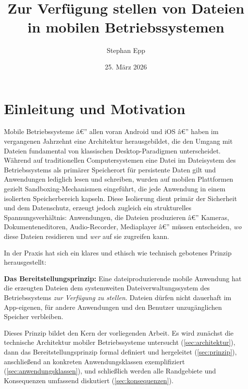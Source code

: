 ﻿\documentclass[12pt, a4paper]{article}
\title{\textbf{Zur Verfügung stellen von Dateien\\ in mobilen Betriebssystemen}}
\author{Stephan Epp}
\date{25. März 2026}
\begin{document}

\maketitle
\tableofcontents
\newpage

\section{Einleitung und Motivation}
\label{sec:einleitung}

Mobile Betriebssysteme â€” allen voran Android und iOS â€” haben im vergangenen Jahrzehnt
eine Architektur herausgebildet, die den Umgang mit Dateien fundamental von klassischen
Desktop-Paradigmen unterscheidet. Während auf traditionellen Computersystemen eine
Datei im Dateisystem des Betriebssystems als primärer Speicherort für persistente Daten
gilt und Anwendungen lediglich lesen und schreiben, wurden auf mobilen Plattformen
gezielt Sandboxing-Mechanismen eingeführt, die jede Anwendung in einem isolierten
Speicherbereich kapseln. Diese Isolierung dient primär der Sicherheit und dem Datenschutz,
erzeugt jedoch zugleich ein strukturelles Spannungsverhältnis: Anwendungen, die Dateien
produzieren â€” Kameras, Dokumenteneditoren, Audio-Recorder, Mediaplayer â€” müssen
entscheiden, \emph{wo} diese Dateien residieren und \emph{wer} auf sie zugreifen kann.

In der Praxis hat sich ein klares und ethisch wie technisch gebotenes Prinzip herausgestellt:

\noindent\textbf{Das Bereitstellungsprinzip:} Eine dateiproduzierende mobile Anwendung hat die
erzeugten Dateien dem systemweiten Dateiverwaltungssystem des Betriebssystems
\emph{zur Verfügung zu stellen}. Dateien dürfen nicht dauerhaft im App-eigenen,
für andere Anwendungen und den Benutzer unzugänglichen Speicher verbleiben.

Dieses Prinzip bildet den Kern der vorliegenden Arbeit. Es wird zunächst die technische
Architektur mobiler Betriebssysteme untersucht (\cref{sec:architektur}), dann das
Bereitstellungsprinzip formal definiert und hergeleitet (\cref{sec:prinzip}), anschließend
an konkreten Anwendungsklassen exemplifiziert (\cref{sec:anwendungsklassen}), und
schließlich werden alle Randgebiete und Konsequenzen umfassend diskutiert
(\cref{sec:konsequenzen}).
\end{document}
